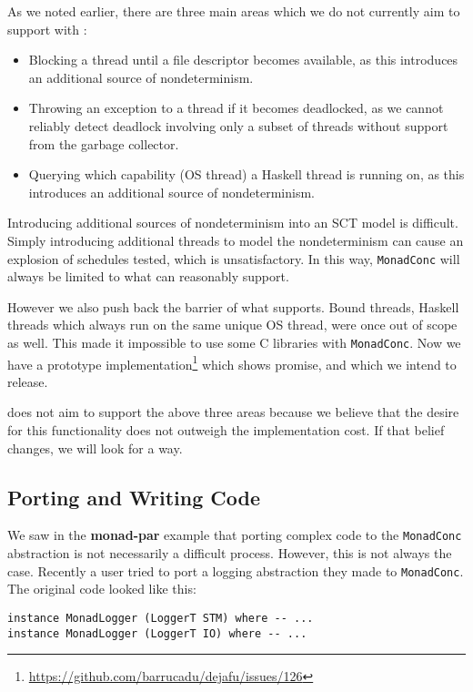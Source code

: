 As we noted earlier, there are three main areas which we do not
currently aim to support with \dejafu{}:

\begin{itemize}
\item Blocking a thread until a file descriptor becomes available, as
  this introduces an additional source of nondeterminism.
\item Throwing an exception to a thread if it becomes deadlocked, as
  we cannot reliably detect deadlock involving only a subset of
  threads without support from the garbage collector.
\item Querying which capability (OS thread) a Haskell thread is
  running on, as this introduces an additional source of
  nondeterminism.
\end{itemize}

Introducing additional sources of nondeterminism into an SCT model is
difficult.  Simply introducing additional threads to model the
nondeterminism can cause an explosion of schedules tested, which is
unsatisfactory.  In this way, \verb|MonadConc| will always be limited
to what \dejafu{} can reasonably support.

However we also push back the barrier of what \dejafu{} supports.
Bound threads, Haskell threads which always run on the same unique OS
thread, were once out of scope as well.  This made it impossible to
use some C libraries with \verb|MonadConc|.  Now we have a prototype
implementation\footnote{\url{https://github.com/barrucadu/dejafu/issues/126}}
which shows promise, and which we intend to release.

\dejafu{} does not aim to support the above three areas because we
believe that the desire for this functionality does not outweigh the
implementation cost.  If that belief changes, we will look for a way.

\subsection{Porting and Writing Code}

We saw in the \textbf{monad-par} example that porting complex code to
the \verb|MonadConc| abstraction is not necessarily a difficult
process.  However, this is not always the case.  Recently a user tried
to port a logging abstraction they made to \verb|MonadConc|.  The
original code looked like this:

\begin{verbatim}
instance MonadLogger (LoggerT STM) where -- ...
instance MonadLogger (LoggerT IO) where -- ...
\end{verbatim}

